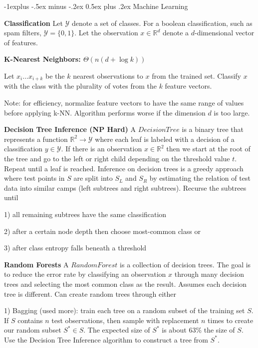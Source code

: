 \documentclass[landscape]{article}
\makeatletter
\renewcommand{\subsection}{\@startsection{subsection}{2}{0mm}%
                            {-1explus -.5ex minus -.2ex}%
                            {0.5ex plus .2ex}%
                            {\normalfont\normalsize\bfseries}}
\makeatother
\begin{document}
\begin{multicols}{3}
\subsection{Machine Learning}

\textbf{Classification}
Let $\mathcal{Y}$ denote a set of classes. For a boolean classification, such as spam filters, $\mathcal{Y} = \{0, 1\}$. Let the observation $x \in \mathbb{R}^d$ denote a $d$-dimensional vector of features.

\textbf{K-Nearest Neighbors: $\Theta(n(d + \log k))$}

Let $x_i \ldots x_{i+k}$ be the $k$ nearest observations to $x$ from the trained set. Classify $x$ with the class with the plurality of votes from the $k$ feature vectors.

Note: for efficiency, normalize feature vectors to have the same range of values before applying k-NN. Algorithm performs worse if the dimension $d$ is too large.

\textbf{Decision Tree Inference (NP Hard)}
A $Decision Tree$ is a binary tree that represents a function $\mathbb{R}^2 \rightarrow \mathcal{Y}$ where each leaf is labeled with a decision of a classification $y \in \mathcal{Y}$. If there is an observation $x \in \mathbb{R}^2$ then we start at the root of the tree and go to the left or right child depending on the threshold value $t$. Repeat until a leaf is reached. Inference on decision trees is a greedy approach where test points in $S$ are split into $S_L$ and $S_R$ by estimating the relation of test data into similar camps (left subtrees and right subtrees). Recurse the subtrees until 

1) all remaining subtrees have the same classification

2) after a certain node depth then choose most-common class or

3) after class entropy falls beneath a threshold

\textbf{Random Forests}
A $RandomForest$ is a collection of decision trees. The goal is to reduce the error rate by classifying an observation $x$ through many decision trees and selecting the most common class as the result. Assumes each decision tree is different. Can create random  trees through either

1) Bagging (used more): train each tree on a random subset of the training set $S$. If $S$ contains $n$ test observations, then sample with replacement $n$ times to create our random subset $S^* \in S$. The expected size of $S^*$ is about 63\% the size of $S$. Use the Decision Tree Inference algorithm to construct a tree from $S^*$.


\end{multicols}
\end{document}
